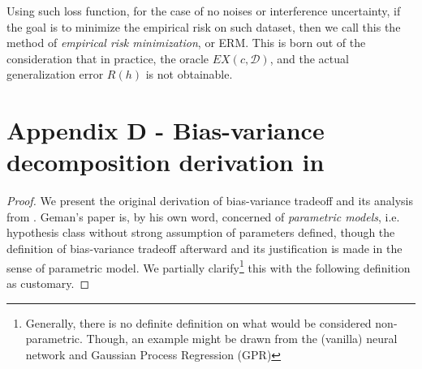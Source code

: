 Using such loss function, for the case of no noises or interference uncertainty, if the goal is to minimize the empirical risk on such dataset, then we call this the method of \textit{empirical risk minimization}, or ERM. This is born out of the consideration that in practice, the oracle $EX(c,\mathcal{D})$, and the actual generalization error $R(h)$ is not obtainable. 
\section*{Appendix D - Bias-variance decomposition derivation in \cite{6797087}}

\begin{proof}
    We present the original derivation of bias-variance tradeoff and its analysis from \cite{6797087}. Geman's paper is, by his own word, concerned of \textit{parametric models}, i.e. hypothesis class without strong assumption of parameters defined, though the definition of bias-variance tradeoff afterward and its justification is made in the sense of parametric model. We partially clarify\footnote{Generally, there is no definite definition on what would be considered non-parametric. Though, an example might be drawn from the (vanilla) neural network and Gaussian Process Regression (GPR)} this with the following definition as customary. 


\end{proof}
